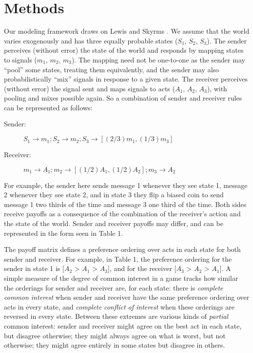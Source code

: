 \documentclass[10pt]{article}
\begin{document}
\section*{Methods}

Our modeling framework draws on Lewis \cite{Lewis1969} and Skyrms
\cite{Skyrms2010}. We assume that the world varies exogenously and has
three equally probable states ($S_{1}$, $S_{2}$,
$S_{3}$). The sender perceives (without error) the state of
the world and responds by mapping states to signals ($m_{1}$,
$m_{2}$, $m_{3}$). The mapping need not be
one-to-one as the sender may ``pool'' some states, treating them
equivalently, and the sender may also probabilistically ``mix'' signals
in response to a given state. The receiver perceives (without error) the
signal sent and maps signals to acts ($A_{1}$,
$A_{2}$, $A_{3}$), with pooling and mixes possible
again. So a combination of sender and receiver rules can be represented
as follows:

\begin{description}
\item[Sender:]
$S_1\rightarrow m_1;S_2\rightarrow m_2;S_3\rightarrow \left[(2/3)m_1, (1/3)m_3\right]$
\item[Receiver:]
$m_1\rightarrow A_1; m_2\rightarrow \left[(1/2)A_1, (1/2)A_2\right]; m_3\rightarrow A_2$
\end{description}

For example, the sender here sends message 1 whenever they see state 1,
message 2 whenever they see state 2, and in state 3 they flip a biased
coin to send message 1 two thirds of the time and message 3 one third of
the time. Both sides receive payoffs as a consequence of the combination
of the receiver's action and the state of the world. Sender and receiver
payoffs may differ, and can be represented in the form seen in Table 1.

The payoff matrix defines a preference ordering over acts in each state
for both sender and receiver. For example, in Table 1, the preference
ordering for the sender in state 1 is {[}$A_{2}$
\textgreater{} $A_{1}$ \textgreater{} $A_{3}${]},
and for the receiver {[}$A_{3}$ \textgreater{}
$A_{2}$ \textgreater{} $A_{1}${]}. A simple
measure of the degree of common interest in a game tracks how similar
the orderings for sender and receiver are, for each state: there is
\emph{complete common interest} when sender and receiver have the same
preference ordering over acts in every state, and \emph{complete
conflict of interest} when these orderings are reversed in every state.
Between these extremes are various kinds of \emph{partial} common
interest: sender and receiver might agree on the best act in each state,
but disagree otherwise; they might always agree on what is worst, but
not otherwise; they might agree entirely in some states but disagree in
others.
\end{document}
